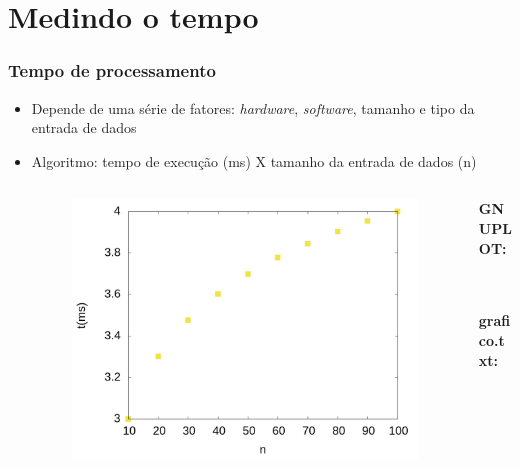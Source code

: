 \documentclass[aspectratio=169]{beamer}
\begin{document}
\section{Medindo o tempo}

\begin{frame}\frametitle{Tempo de processamento}
\begin{itemize}
	\item Depende de uma série de fatores: \emph{hardware}, \emph{software}, tamanho e tipo da entrada de dados
	\item Algoritmo: tempo de execução (ms) X tamanho da entrada de dados (n)
\begin{columns}[T]
\begin{column}{0.5\linewidth}
\begin{figure}[h]
	\centering
	\includegraphics[height=0.6\paperheight]{graficos/grafico.jpg}
\end{figure}
\end{column}
\begin{column}{0.5\linewidth}
\vspace{5mm}
{\fontsize{0}{4}\selectfont{}\textbf{GNUPLOT:}

~\\
~\\
\textbf{grafico.txt:}

}
\end{column}
\end{columns}

\end{itemize}
\end{frame}
\end{document}
